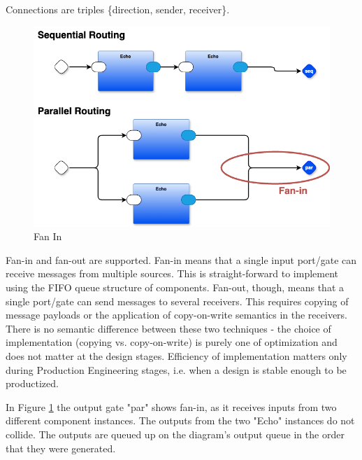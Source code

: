 \documentclass[10pt,anonymous,review]{acmart}
\begin{document}
Connections are triples \{direction, sender, receiver\}.


  \begin{figure}
    \includegraphics[scale=0.1]{./media/fanin.png}
    \caption{Fan In}
    \label{fanin}
  \end{figure}

Fan-in and fan-out are supported. Fan-in means that a single input port/gate can receive messages from multiple sources. This is straight-forward to implement using the FIFO queue structure of components. Fan-out, though, means that a single port/gate can send messages to several receivers. This requires copying of message payloads or the application of copy-on-write semantics in the receivers. There is no semantic difference between these two techniques - the choice of implementation (copying vs. copy-on-write) is purely one of optimization and does not matter at the design stages. Efficiency of implementation matters only during Production Engineering stages, i.e. when a design is stable enough to be productized.

In Figure \ref{fanin} the output gate "par" shows fan-in, as it receives inputs from two different component instances. The outputs from the two "Echo" instances do not collide. The outputs are queued up on the diagram's output queue in the order that they were generated.
\end{document}
